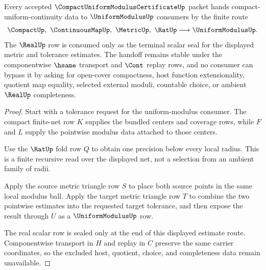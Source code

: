 \begin{theorem}
\label{thm:compact-modulus-fan-uniform-continuity-handoff}
Every accepted $\CompactUniformModulusCertificateUp$ packet hands compact-uniform-continuity data to $\UniformModulusUp$ consumers by the finite route
$$
\CompactUp,\ \ContinuousMapUp,\ \MetricUp,\ \RatUp \longrightarrow \UniformModulusUp .
$$
The $\RealUp$ row is consumed only as the terminal scalar seal for the displayed metric and tolerance estimates. The handoff remains stable under the componentwise $\hsame$ transport and $\Cont$ replay rows, and no consumer can bypass it by asking for open-cover compactness, host function extensionality, quotient map equality, selected external moduli, countable choice, or ambient $\RealUp$ completeness.
\end{theorem}
\begin{proof}
Start with a tolerance request for the uniform-modulus consumer. The compact finite-net row $K$ supplies the bundled centers and coverage rows, while $F$ and $L$ supply the pointwise modulus data attached to those centers.

Use the $\RatUp$ fold row $Q$ to obtain one precision below every local radius. This is a finite recursive read over the displayed net, not a selection from an ambient family of radii.

Apply the source metric triangle row $S$ to place both source points in the same local modulus ball. Apply the target metric triangle row $T$ to combine the two pointwise estimates into the requested target tolerance, and then expose the result through $U$ as a $\UniformModulusUp$ row.

The real scalar row is sealed only at the end of this displayed estimate route. Componentwise transport in $H$ and replay in $C$ preserve the same carrier coordinates, so the excluded host, quotient, choice, and completeness data remain unavailable.
\end{proof}


